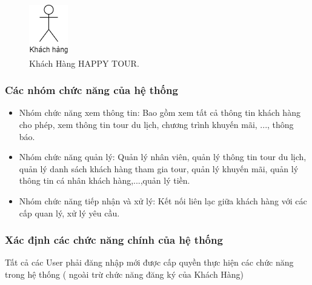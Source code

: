 
\begin{figure}[ht]
    \centering
    \includegraphics[width = 0.1\linewidth]{figures/Khách Hàng.png}
    \caption{Khách Hàng HAPPY TOUR.}
    \label{fig:example_1}
\end{figure}

\subsubsection{Các nhóm chức năng của hệ thống}

\begin{itemize}
\item Nhóm chức năng xem thông tin: Bao gồm xem tất cả thông tin khách hàng cho  phép, xem thông tin tour du lịch, chương trình khuyến mãi, ..., thông báo.
\item Nhóm chức năng quản lý: Quản lý nhân viên, quản lý thông tin tour du lịch, quản lý danh sách khách hàng tham gia tour, quản lý khuyến mãi, quản lý thông tin cá nhân khách hàng,...,quản lý tiền.
\item Nhóm chức năng tiếp nhận và xử lý: Kết nối liên lạc giữa khách hàng với các cấp quan lý, xử lý yêu cầu.
\end{itemize}

\subsubsection{Xác định các chức năng chính của hệ thống}

Tất cả các User phải đăng nhập mới được cấp quyền thực hiện các chức năng trong hệ thống ( ngoài trừ chức năng đăng ký của Khách Hàng)

